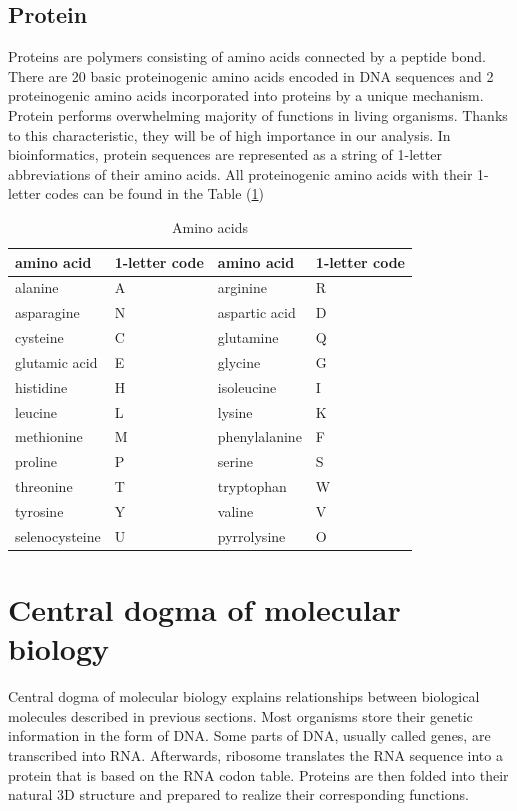 \subsection{Protein}
Proteins are polymers consisting of amino acids connected by a peptide bond.
There are 20 basic proteinogenic amino acids encoded in DNA sequences and 2 proteinogenic amino acids incorporated into proteins by a unique mechanism.
Protein performs overwhelming majority of functions in living organisms.
Thanks to this characteristic, they will be of high importance in our analysis.
In bioinformatics, protein sequences are represented as a string of 1-letter abbreviations of their amino acids. All proteinogenic amino acids with their 1-letter codes can be found in the Table (\ref{tab:amino})

\begin{table}
  \centering
	\begin{tabular}{ l  l  l  l }
  	\hline
  	amino acid & 1-letter code & amino acid & 1-letter code \\
  	\hline  
  	alanine & A & arginine & R \\
  	asparagine & N & aspartic acid & D \\
  	cysteine & C & glutamine & Q \\
  	glutamic acid & E & glycine & G \\
  	histidine & H & isoleucine & I \\
  	leucine & L & lysine & K \\
  	methionine & M & phenylalanine & F \\
  	proline & P & serine & S \\
  	threonine & T & tryptophan & W \\
  	tyrosine & Y & valine & V \\
  	selenocysteine & U & pyrrolysine & O \\
  	\hline
	\end{tabular}
	\caption{Amino acids}
	\label{tab:amino}
\end{table}
 


\section{Central dogma of molecular biology}
Central dogma of molecular biology explains relationships between biological molecules described in previous sections.
Most organisms store their genetic information in the form of DNA.
Some parts of DNA, usually called genes, are transcribed into RNA.
Afterwards, ribosome translates the RNA sequence into a protein that is based on the RNA codon table.
Proteins are then folded into their natural 3D structure and prepared to realize their corresponding functions.

